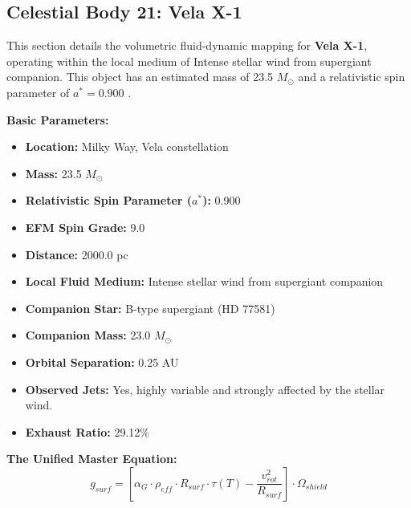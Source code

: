 \documentclass[11pt, a4paper]{article}
\begin{document}
\clearpage
\subsection{Celestial Body 21: Vela X-1}
This section details the volumetric fluid-dynamic mapping for \textbf{Vela X-1}, operating within the local medium of Intense stellar wind from supergiant companion. This object has an estimated mass of 23.5 $M_{\odot}$ and a relativistic spin parameter of $a^* = 0.900$ \cite{quaintrell2003, simbad}.

\vspace{0.5em}
\noindent \textbf{Basic Parameters:}
\begin{itemize}
  \item \textbf{Location:} Milky Way, Vela constellation
  \item \textbf{Mass:} 23.5 $M_{\odot}$
  \item \textbf{Relativistic Spin Parameter ($a^*$):} 0.900
  \item \textbf{EFM Spin Grade:} 9.0
  \item \textbf{Distance:} 2000.0 pc
  \item \textbf{Local Fluid Medium:} Intense stellar wind from supergiant companion
  \item \textbf{Companion Star:} B-type supergiant (HD 77581)
  \item \textbf{Companion Mass:} 23.0 $M_{\odot}$
  \item \textbf{Orbital Separation:} 0.25 AU
  \item \textbf{Observed Jets:} Yes, highly variable and strongly affected by the stellar wind.
  \item \textbf{Exhaust Ratio:} 29.12\%
\end{itemize}

\vspace{0.5em}
\noindent \textbf{The Unified Master Equation:}
$$ g_{surf} = \left[ \alpha_G \cdot \rho_{eff} \cdot R_{surf} \cdot \tau(T) - \frac{v_{rot}^2}{R_{surf}} \right] \cdot \Omega_{shield} $$
\end{document}
